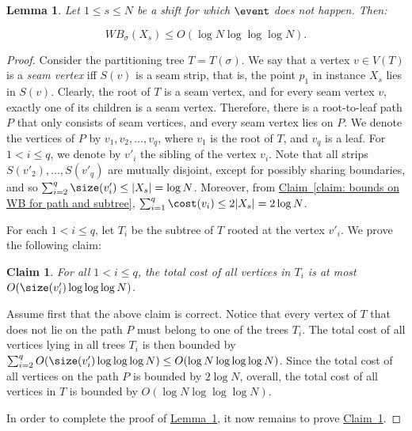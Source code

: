 \documentclass[11pt]{article}
\numberwithin{equation}{section}
\newtheorem{lemma}[theorem]{Lemma}
\newtheorem{claim}[theorem]{Claim}
\theoremstyle{definition}
\theoremstyle{plain}
\newcommand{\expref}[2]{\hyperref[#2]{#1~\ref{#2}}}
\begin{document}
\begin{lemma}\label{lem: no bad event low cost}
	Let $1\leq s\leq N$ be a shift for which $\event$ does not happen. Then:
	
	 $$WB_{\sigma}(X_s)\leq O(\log N\log\log\log N).$$
\end{lemma}

\begin{proof}
	Consider the partitioning tree $T=T(\sigma)$. 
We say that a vertex $v\in V(T)$ is a \emph{seam vertex} iff $S(v)$ is a seam strip, that is, the point $p_1$ in instance $X_s$ lies in $S(v)$.  
Clearly, the root of $T$ is a seam vertex, and for every seam vertex $v$, exactly one of its children is a seam vertex. 
Therefore, there is a root-to-leaf path $P$ that only consists of seam vertices, and every seam vertex lies on $P$. 
We denote the vertices of $P$ by $v_1,v_2,\ldots,v_q$, where $v_1$ is the root of $T$, and $v_q$ is a leaf. 
For $1<i\leq q$, we denote by $v'_i$ the sibling of the vertex $v_i$. 
Note that all strips $S(v'_2),\ldots,S(v'_q)$ are mutually disjoint, except for possibly sharing boundaries, and so $\sum_{i=2}^q\size(v'_i)\leq |X_s|= \log N$. 
Moreover, from \expref{Claim}{claim: bounds on WB for path and subtree}, $\sum_{i=1}^q\cost(v_i)\leq 2|X_s|=2\log N$.
	
For each $1<i\leq q$, let $T_i$ be the subtree of $T$ rooted at the vertex $v'_i$. We prove the following claim:
	
	\begin{claim}\label{claim: bounding subtrees}
		For all $1<i\leq q$, the total cost of all vertices in $T_i$ is at most $O(\size(v'_i)\log\log\log N)$.
	\end{claim}
	
	Assume first that the above claim is correct. Notice that every vertex of $T$ that does not lie on the path $P$ must belong to one of the trees $T_i$. 
The total cost of all vertices lying in all trees $T_i$ is then bounded by $\sum_{i=2}^qO(\size(v'_i)\log\log\log N)\leq O(\log N\log\log\log N)$. 
Since the total cost of all vertices on the path $P$ is bounded by $2\log N$, overall, the total cost of all vertices in $T$ is bounded by $O(\log N\log\log\log N)$.


In order to complete the proof of \expref{Lemma}{lem: no bad event low cost}, it now remains to prove \expref{Claim}{claim: bounding subtrees}.


\end{proof}
\end{document}

